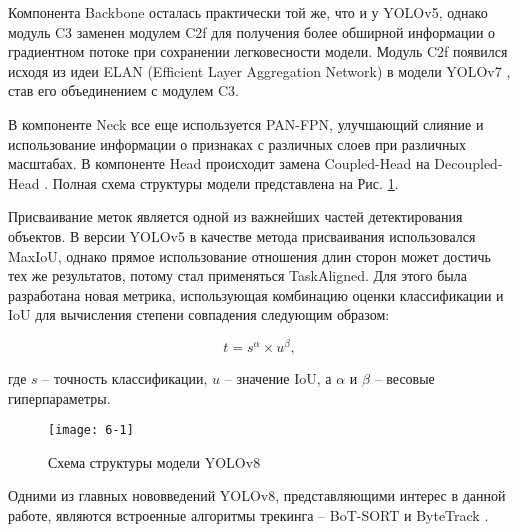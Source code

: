 Компонента Backbone осталась практически той же, что и у YOLOv5, однако модуль C3 заменен модулем C2f для получения более обширной информации о градиентном потоке при сохранении легковесности модели. Модуль C2f появился исходя из идеи ELAN (Efficient Layer Aggregation Network) в модели YOLOv7 \cite{6-6}, став его объединением с модулем C3.

В компоненте Neck все еще используется PAN-FPN, улучшающий слияние и использование информации о признаках с различных слоев при различных масштабах. В компоненте Head происходит замена Coupled-Head на Decoupled-Head \cite{6-7}. Полная схема структуры модели представлена на Рис. \ref{img:6-1}.

Присваивание меток является одной из важнейших частей детектирования объектов. В версии YOLOv5 в качестве метода присваивания использовался MaxIoU, однако прямое использование отношения длин сторон может достичь тех же результатов, потому стал применяться TaskAligned. Для этого была разработана новая метрика, использующая комбинацию оценки классификации и IoU для вычисления степени совпадения следующим образом:

\begin{equation}
    t = s^{\alpha} \times u^{\beta},
\end{equation}

\noindent где $s$ -- точность классификации, $u$ -- значение IoU, а $\alpha$ и $\beta$ -- весовые гиперпараметры.

\begin{figure}[ht]
    \centering
    \texttt{[image: 6-1]}
    \caption{Схема структуры модели YOLOv8}
    \label{img:6-1}
\end{figure}

Одними из главных нововведений YOLOv8, представляющими интерес в данной работе, являются встроенные алгоритмы трекинга -- BoT-SORT \cite{6-8} и ByteTrack \cite{6-9}. 
